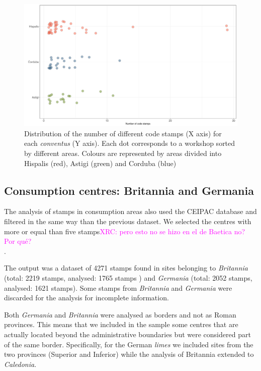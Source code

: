 \documentclass[review]{elsarticle}
\newcommand{\memo}[2]{\textcolor{#1}{#2}}
\newcommand{\xavi}[1]{\memo{magenta}{XRC: #1\\}}
\begin{document}
\begin{figure}[htp]
	\centering
\includegraphics[width=\linewidth]{figs/frequency}
\caption{Distribution of the number of different code stamps (X axis) for each \textit{conventus} (Y axis). Each dot corresponds to a workshop sorted by different areas. Colours are represented by areas divided into Hispalis (red), Astigi (green) and Corduba (blue)}
\label{frequency}
\end{figure} 



\subsection{Consumption centres: Britannia and Germania}


The analysis of stamps in consumption areas also used the CEIPAC database and filtered in the same way than the previous dataset. We selected the centres with more or equal than five stamps\xavi{pero esto no se hizo en el de Baetica no? Por qué?}.

The output was a dataset of 4271 stamps found in sites belonging to \textit{Britannia} (total: 2219 stamps, analysed: 1765 stamps ) and \textit{Germania} (total: 2052 stamps, analysed: 1621 stamps). Some stamps from \textit{Britannia} and \textit{Germania} were discarded for the analysis for incomplete information.  

Both \textit{Germania} and \textit{Britannia} were analysed as borders and not as Roman provinces. This means that we included in the sample some centres that are actually located beyond the administrative boundaries but were considered part of the same border. Specifically, for the German \textit{limes} we included sites from the two provinces (Superior and Inferior) while the analysis of Britannia extended to \textit{Caledonia}.
 
\end{document}
